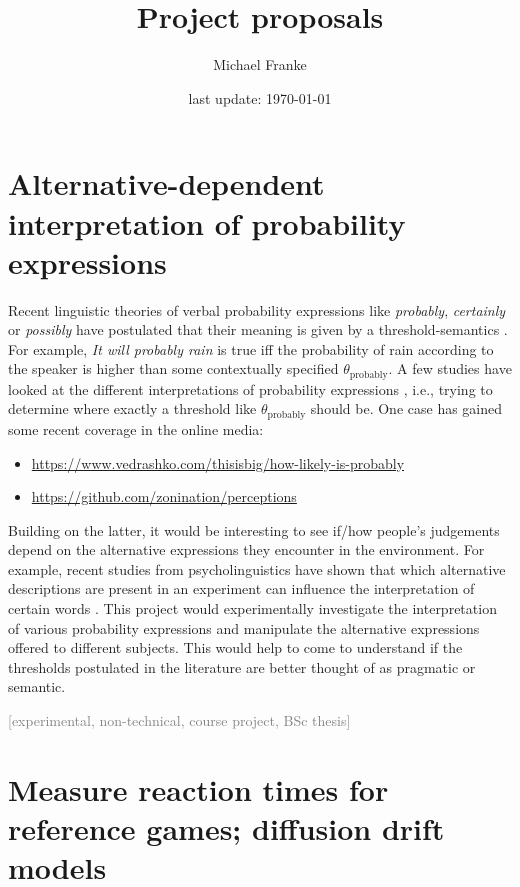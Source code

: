 \documentclass[fleqn,reqno,10pt]{article}
\title{Project proposals}
\author{Michael Franke}
\date{last update: \today}
\newcommand{\scope}[1]{\hfill\textcolor{gray}{[#1]}}
\begin{document}
\maketitle

\section{Alternative-dependent interpretation of probability expressions}

Recent linguistic theories of verbal probability expressions like \emph{probably}, \emph{certainly} or \emph{possibly} have postulated that their meaning is given by a threshold-semantics \citep[e.g.][]{Yalcin2010:Probability-Ope}. For example, \emph{It will probably rain} is true iff the probability of rain according to the speaker is higher than some contextually specified $\theta_{\text{probably}}$. A few studies have looked at the different interpretations of probability expressions \citep[e.g.][]{wind1996}, i.e., trying to determine where exactly a threshold like $\theta_{\text{probably}}$ should be. One case has gained some recent coverage in the online media:
%
\begin{itemize}
\item \url{https://www.vedrashko.com/thisisbig/how-likely-is-probably}
\item \url{https://github.com/zonination/perceptions}
\end{itemize}
%
Building on the latter, it would be interesting to see if/how people's judgements depend on the alternative expressions they encounter in the environment. For example, recent studies from psycholinguistics have shown that which alternative descriptions are present in an experiment can influence the interpretation of certain words \citep[e.g.][]{DegenTanenhaus2012:Processing-Scal,Franke2016:Task-types-link}. This project would experimentally investigate the interpretation of various probability expressions and manipulate the alternative expressions offered to different subjects. This would help to come to understand if the thresholds postulated in the literature are better thought of as pragmatic or semantic.

\scope{experimental, non-technical, course project, BSc thesis} 

\section{Measure reaction times for reference games; diffusion drift models}
\end{document}
